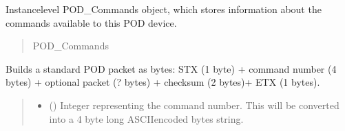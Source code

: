 \documentclass[letterpaper,10pt,english]{sphinxmanual}
\begin{document}
\begin{fulllineitems}

\begin{fulllineitems}
\label{\detokenize{Morelia.Devices:Morelia.Devices.BasicPodProtocol.Pod._commands}}
\pysigstartsignatures
{}
\pysigstopsignatures
\sphinxAtStartPar
Instance\sphinxhyphen{}level POD\_Commands object, which stores information about             the commands available to this POD device.
\begin{quote}\begin{description}
\sphinxAtStartPar
POD\_Commands

\end{description}\end{quote}

\end{fulllineitems}


\begin{fulllineitems}
\label{\detokenize{Morelia.Devices:Morelia.Devices.BasicPodProtocol.Pod.BuildPODpacket_Standard}}
\pysigstartsignatures
{}
\pysigstopsignatures
\sphinxAtStartPar
Builds a standard POD packet as bytes: STX (1 byte) + command number (4 bytes)         + optional packet (? bytes) + checksum (2 bytes)+ ETX (1 bytes).
\begin{quote}\begin{description}
\begin{itemize}
\item {} 
\sphinxAtStartPar
{} () \textendash{} Integer representing the command number. This will be converted into                 a 4 byte long ASCII\sphinxhyphen{}encoded bytes string.


\end{itemize}
\end{description}
\end{quote}
\end{fulllineitems}
\end{fulllineitems}
\end{document}
